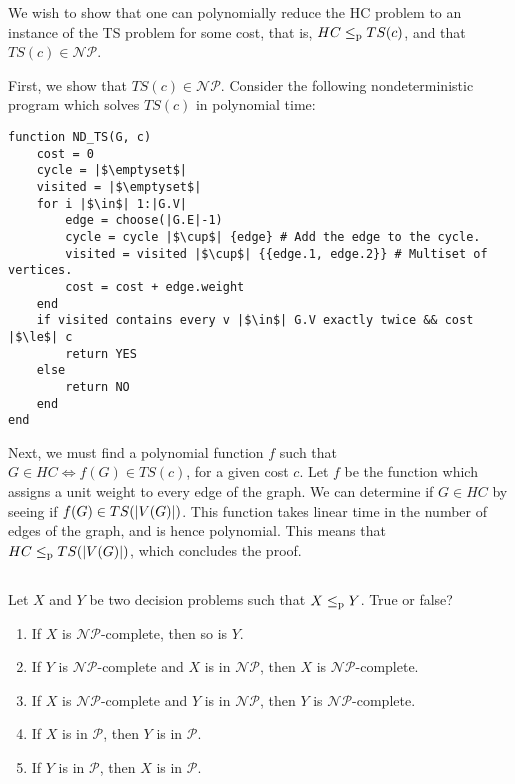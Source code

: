 \begin{solution}
	We wish to show that one can polynomially reduce
	the HC problem to an instance of the TS problem for some cost, that is,
	\(HC \le_\textnormal{p} TS(c)\),
	and that \(TS(c) \in \mathcal{NP}\).

	First, we show that \(TS(c) \in \mathcal{NP}\).
	Consider the following nondeterministic program
	which solves \(TS(c)\) in polynomial time:
\begin{verbatim}
function ND_TS(G, c)
	cost = 0
	cycle = |$\emptyset$|
	visited = |$\emptyset$|
	for i |$\in$| 1:|G.V|
		edge = choose(|G.E|-1)
		cycle = cycle |$\cup$| {edge} # Add the edge to the cycle.
		visited = visited |$\cup$| {{edge.1, edge.2}} # Multiset of vertices.
		cost = cost + edge.weight
	end
	if visited contains every v |$\in$| G.V exactly twice && cost |$\le$| c
		return YES
	else
		return NO
	end
end
\end{verbatim}

	Next, we must find a polynomial function \(f\)
	such that \(G \in HC \iff f(G) \in TS(c)\),
	for a given cost \(c\).
	Let \(f\) be the function which assigns a unit weight
	to every edge of the graph.
	We can determine if \(G \in HC\)
	by seeing if \(f(G) \in TS(\left\lvert V(G)\right\lvert)\).
	This function takes linear time
	in the number of edges of the graph,
	and is hence polynomial.
	This means that \(HC \le_\textnormal{p} TS(\left\lvert V(G)\right\lvert)\),
	which concludes the proof.
\end{solution}

\subsection{} %
Let \(X\) and \(Y\) be two decision problems such that \(X \le_\textnormal{p} Y\).
True or false?
\begin{enumerate}
	\item If \(X\) is \(\mathcal{NP}\)-complete, then so is \(Y\).
	\item If \(Y\) is \(\mathcal{NP}\)-complete
	and \(X\) is in \(\mathcal{NP}\),
	then \(X\) is \(\mathcal{NP}\)-complete.
	\item If \(X\) is \(\mathcal{NP}\)-complete
	and \(Y\) is in \(\mathcal{NP}\),
	then \(Y\) is \(\mathcal{NP}\)-complete.
	\item If \(X\) is in \(\mathcal{P}\),
	then \(Y\) is in \(\mathcal{P}\).
	\item If \(Y\) is in \(\mathcal{P}\),
	then \(X\) is in \(\mathcal{P}\).
\end{enumerate}

